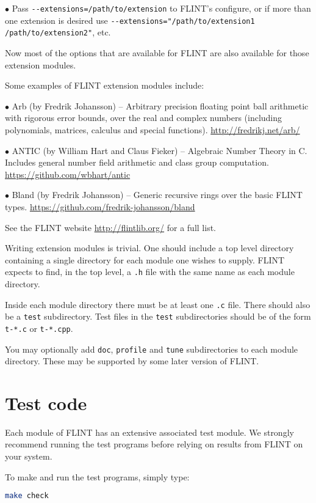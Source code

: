\documentclass[a4paper,10pt]{book}
\newcommand{\code}{\lstinline}
\begin{document}
$\bullet$ Pass \code{--extensions=/path/to/extension} to FLINT's
configure, or if more than one extension is desired use
\code{--extensions="/path/to/extension1 /path/to/extension2"},
etc.

Now most of the options that are available for FLINT are also
available for those extension modules.

Some examples of FLINT extension modules include:

$\bullet$ Arb (by Fredrik Johansson) -- Arbitrary precision floating
point ball arithmetic with rigorous error bounds, over the real and
complex numbers (including polynomials, matrices, calculus and special
functions). \url{http://fredrikj.net/arb/}

$\bullet$ ANTIC (by William Hart and Claus Fieker) -- Algebraic Number
Theory in C. Includes general number field arithmetic and class group
computation. \url{https://github.com/wbhart/antic}

$\bullet$ Bland (by Fredrik Johansson) -- Generic recursive rings over
the basic FLINT types. \url{https://github.com/fredrik-johansson/bland}

See the FLINT website \url{http://flintlib.org/} for a full list.

Writing extension modules is trivial. One should include a top level
directory containing a single directory for each module one wishes to
supply. FLINT expects to find, in the top level, a \code{.h} file with
the same name as each module directory.

Inside each module directory there must be at least one \code{.c} file.
There should also be a \code{test} subdirectory. Test files in the
\code{test} subdirectories should be of the form \code{t-*.c} or
\code{t-*.cpp}.

You may optionally add \code{doc}, \code{profile} and \code{tune}
subdirectories to each module directory. These may be supported by some
later version of FLINT.

\chapter{Test code}

Each module of FLINT has an extensive associated test module.  We
strongly recommend running the test programs before relying on results
from FLINT on your system.

To make and run the test programs, simply type:
\begin{lstlisting}[language=bash]
make check
\end{lstlisting}
\end{document}
